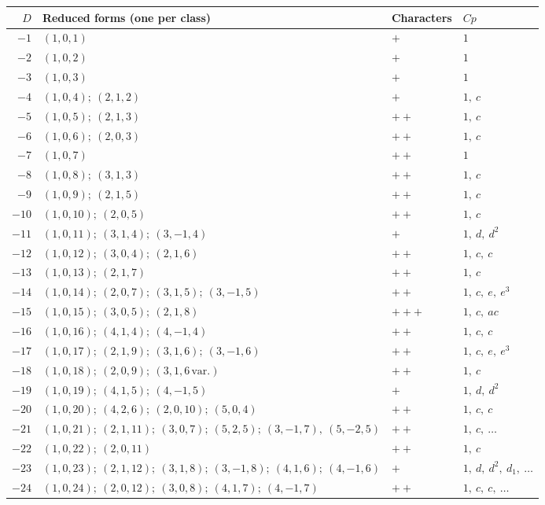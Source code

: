 \documentclass[11pt,a4paper]{article}
\theoremstyle{plain}
\begin{document}
\begin{longtable}{r|p{}|l|l}
$D$ & Reduced forms (one per class) & Characters & $Cp$ \\
\hline
\endhead
$-1$ & $(1,0,1)$ & $+$ & $1$ \\
$-2$ & $(1,0,2)$ & $+$ & $1$ \\
$-3$ & $(1,0,3)$ & $+$ & $1$ \\
$-4$ & $(1,0,4);\ (2,1,2)$ & $+$ & $1,\ c$ \\
$-5$ & $(1,0,5);\ (2,1,3)$ & $++$ & $1,\ c$ \\
$-6$ & $(1,0,6);\ (2,0,3)$ & $++$ & $1,\ c$ \\
$-7$ & $(1,0,7)$ & $++$ & $1$ \\
$-8$ & $(1,0,8);\ (3,1,3)$ & $++$ & $1,\ c$ \\
$-9$ & $(1,0,9);\ (2,1,5)$ & $++$ & $1,\ c$ \\
$-10$ & $(1,0,10);\ (2,0,5)$ & $++$ & $1,\ c$ \\
$-11$ & $(1,0,11);\ (3,1,4);\ (3,-1,4)$ & $+$ & $1,\ d,\ d^{2}$ \\
$-12$ & $(1,0,12);\ (3,0,4);\ (2,1,6)$ & $++$ & $1,\ c,\ c$ \\
$-13$ & $(1,0,13);\ (2,1,7)$ & $++$ & $1,\ c$ \\
$-14$ & $(1,0,14);\ (2,0,7);\ (3,1,5);\ (3,-1,5)$ & $++$ & $1,\ c,\ e,\ e^{3}$ \\
$-15$ & $(1,0,15);\ (3,0,5);\ (2,1,8)$ & $+++$ & $1,\ c,\ ac$ \\
$-16$ & $(1,0,16);\ (4,1,4);\ (4,-1,4)$ & $++$ & $1,\ c,\ c$ \\
$-17$ & $(1,0,17);\ (2,1,9);\ (3,1,6);\ (3,-1,6)$ & $++$ & $1,\ c,\ e,\ e^{3}$ \\
$-18$ & $(1,0,18);\ (2,0,9);\ (3,1,6\,\text{var.})$ & $++$ & $1,\ c$ \\
$-19$ & $(1,0,19);\ (4,1,5);\ (4,-1,5)$ & $+$ & $1,\ d,\ d^{2}$ \\
$-20$ & $(1,0,20);\ (4,2,6);\ (2,0,10);\ (5,0,4)$ & $++$ & $1,\ c,\ c$ \\
$-21$ & $(1,0,21);\ (2,1,11);\ (3,0,7);\ (5,2,5);\ (3,-1,7),\ (5,-2,5)$ & $++$ & $1,\ c,\ \ldots$ \\
$-22$ & $(1,0,22);\ (2,0,11)$ & $++$ & $1,\ c$ \\
$-23$ & $(1,0,23);\ (2,1,12);\ (3,1,8);\ (3,-1,8);\ (4,1,6);\ (4,-1,6)$ & $+$ & $1,\ d,\ d^{2},\ d_1,\ \ldots$ \\
$-24$ & $(1,0,24);\ (2,0,12);\ (3,0,8);\ (4,1,7);\ (4,-1,7)$ & $++$ & $1,\ c,\ c,\ \ldots$ \\

\end{longtable}
\end{document}
